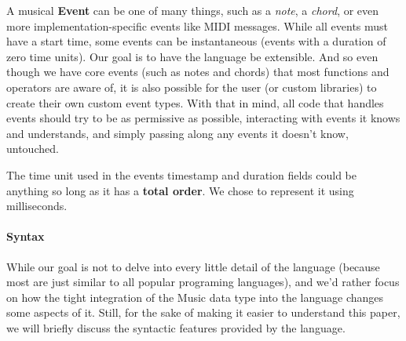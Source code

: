 \documentclass[a4paper,UKenglish,cleveref, autoref]{oasics-v2019}
\begin{document}
A musical \textbf{Event} can be one of many things, such as a \textit{note}, a \textit{chord}, or even more implementation-specific events like MIDI messages\cite{Loy1985MusiciansMA}. While all events must have a start time, some events can be instantaneous (events with a duration of zero time units). Our goal is to have the language be extensible. And so even though we have core events (such as notes and chords) that most functions and operators are aware of, it is also possible for the user (or custom libraries) to create their own custom event types. With that in mind, all code that handles events should try to be as permissive as possible, interacting with events it knows and understands, and simply passing along any events it doesn't know, untouched.

The time unit used in the events timestamp and duration fields could be anything so long as it has a \textbf{total order}. We chose to represent it using milliseconds.

\paragraph*{Syntax}
While our goal is not to delve into every little detail of the language (because most are just similar to all popular programing languages), and we'd rather focus on how the tight integration of the Music data type into the language changes some aspects of it. Still, for the sake of making it easier to understand this paper, we will briefly discuss the syntactic features provided by the language.
\end{document}

